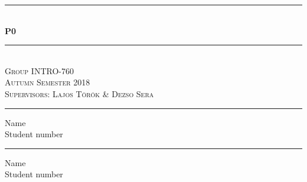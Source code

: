 
\usepackage[export]{adjustbox}

\newcommand\tab[1][1cm]{\hspace*{#1}}


	
\begin{titlingpage}

\begin{center}
	
	
\newcommand{\HRule}{\rule{\linewidth}{0.1mm}} %

\vspace*{5cm}

\HRule \\[0.8cm]
{\huge \bfseries \textsc{P0}}\\[0.2cm]
\HRule \\[1.5cm]


\textsc{\huge Group INTRO-760}\\
\textsc{\large Autumn Semester 2018}\\
\textsc{Supervisors: Lajos Török \& Dezso Sera}

\vspace{50pt}
\begin{minipage}{0.25\linewidth}
	\centering
	\hrule
	\vspace{12pt}
	Name\\ %
	Student number %
\end{minipage}
\hspace{10pt}
\begin{minipage}{0.25\linewidth}
	\centering
	\hrule
	\vspace{12pt}
	Name\\ %
	Student number %


\end{minipage}
\end{center}
\end{titlingpage}
